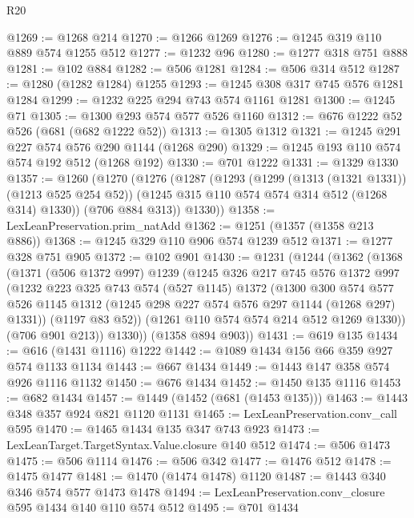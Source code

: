 \begin{lexlean}{R20}
\begin{coremodule}
@1269 := @1268 @214
@1270 := @1266 @1269
@1276 := @1245 @319 @110 @889 @574 @1255 @512
@1277 := @1232 @96
@1280 := @1277 @318 @751 @888
@1281 := @102 @884
@1282 := @506 @1281
@1284 := @506 @314 @512
@1287 := @1280 (@1282 @1284) @1255
@1293 := @1245 @308 @317 @745 @576 @1281 @1284
@1299 := @1232 @225 @294 @743 @574 @1161 @1281
@1300 := @1245 @71
@1305 := @1300 @293 @574 @577 @526 @1160
@1312 := @676 @1222 @52 @526 (@681 (@682 @1222 @52))
@1313 := @1305 @1312
@1321 := @1245 @291 @227 @574 @576 @290 @1144 (@1268 @290)
@1329 := @1245 @193 @110 @574 @574 @192 @512 (@1268 @192)
@1330 := @701 @1222
@1331 := @1329 @1330
@1357 := @1260
    (@1270
      (@1276
        (@1287
          (@1293
            (@1299 (@1313 (@1321 @1331)) (@1213 @525 @254 @52))
            (@1245 @315 @110 @574 @574 @314 @512 (@1268 @314) @1330))
          (@706 @884 @313))
        @1330))
@1358 := LexLeanPreservation.prim_natAdd
@1362 := @1251 (@1357 (@1358 @213 @886))
@1368 := @1245 @329 @110 @906 @574 @1239 @512
@1371 := @1277 @328 @751 @905
@1372 := @102 @901
@1430 := @1231
    (@1244
      (@1362
        (@1368
          (@1371
            (@506 @1372 @997)
            @1239
            (@1245
              @326
              @217
              @745
              @576
              @1372
              @997
              (@1232
                @223
                @325
                @743
                @574
                (@527 @1145)
                @1372
                (@1300
                  @300
                  @574
                  @577
                  @526
                  @1145
                  @1312
                  (@1245 @298 @227 @574 @576 @297 @1144 (@1268 @297) @1331))
                (@1197 @83 @52))
              (@1261 @110 @574 @574 @214 @512 @1269 @1330))
            (@706 @901 @213))
          @1330))
      (@1358 @894 @903))
@1431 := @619 @135
@1434 := @616 (@1431 @1116) @1222
@1442 := @1089 @1434 @156 @66 @359 @927 @574 @1133 @1134
@1443 := @667 @1434
@1449 := @1443 @147 @358 @574 @926 @1116 @1132
@1450 := @676 @1434
@1452 := @1450 @135 @1116
@1453 := @682 @1434
@1457 := @1449 (@1452 (@681 (@1453 @135)))
@1463 := @1443 @348 @357 @924 @821 @1120 @1131
@1465 := LexLeanPreservation.conv_call @595
@1470 := @1465 @1434 @135 @347 @743 @923
@1473 := LexLeanTarget.TargetSyntax.Value.closure @140 @512
@1474 := @506 @1473
@1475 := @506 @1114
@1476 := @506 @342
@1477 := @1476 @512
@1478 := @1475 @1477
@1481 := @1470 (@1474 @1478) @1120
@1487 := @1443 @340 @346 @574 @577 @1473 @1478
@1494 := LexLeanPreservation.conv_closure @595 @1434 @140 @110 @574 @512
@1495 := @701 @1434

\end{coremodule}
\end{lexlean}

